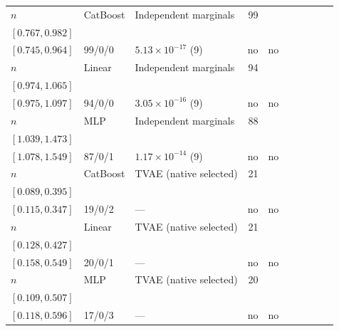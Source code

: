\begin{longtable}{@{}ll>{\raggedright\arraybackslash}p{1.1in}rllrlll@{}}
$n$ & CatBoost & Independent marginals & 99 & \begin{tabular}[t]{@{}l@{}}$0.866$\\\tiny$[0.767, 0.982]$\end{tabular} & \begin{tabular}[t]{@{}l@{}}$0.849$\\\tiny$[0.745, 0.964]$\end{tabular} & 99/0/0 & $5.13\times 10^{-17}$ (9) & no & no \\
$n$ & Linear & Independent marginals & 94 & \begin{tabular}[t]{@{}l@{}}$1.002$\\\tiny$[0.974, 1.065]$\end{tabular} & \begin{tabular}[t]{@{}l@{}}$1.023$\\\tiny$[0.975, 1.097]$\end{tabular} & 94/0/0 & $3.05\times 10^{-16}$ (9) & no & no \\
$n$ & MLP & Independent marginals & 88 & \begin{tabular}[t]{@{}l@{}}$1.164$\\\tiny$[1.039, 1.473]$\end{tabular} & \begin{tabular}[t]{@{}l@{}}$1.265$\\\tiny$[1.078, 1.549]$\end{tabular} & 87/0/1 & $1.17\times 10^{-14}$ (9) & no & no \\
$n$ & CatBoost & TVAE (native selected) & 21 & \begin{tabular}[t]{@{}l@{}}$0.195$\\\tiny$[0.089, 0.395]$\end{tabular} & \begin{tabular}[t]{@{}l@{}}$0.221$\\\tiny$[0.115, 0.347]$\end{tabular} & 19/0/2 & --- & no & no \\
$n$ & Linear & TVAE (native selected) & 21 & \begin{tabular}[t]{@{}l@{}}$0.250$\\\tiny$[0.128, 0.427]$\end{tabular} & \begin{tabular}[t]{@{}l@{}}$0.284$\\\tiny$[0.158, 0.549]$\end{tabular} & 20/0/1 & --- & no & no \\
$n$ & MLP & TVAE (native selected) & 20 & \begin{tabular}[t]{@{}l@{}}$0.221$\\\tiny$[0.109, 0.507]$\end{tabular} & \begin{tabular}[t]{@{}l@{}}$0.254$\\\tiny$[0.118, 0.596]$\end{tabular} & 17/0/3 & --- & no & no \\

\end{longtable}
